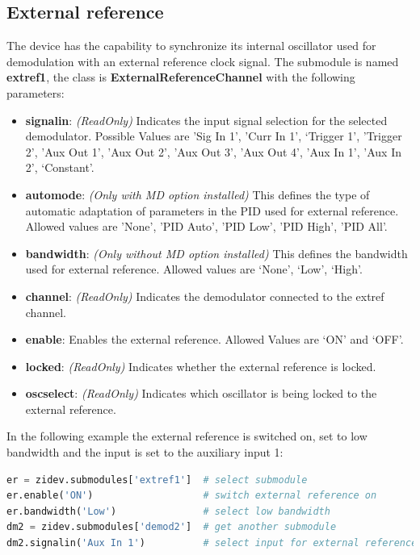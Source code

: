 \documentclass[11pt]{article} %
\begin{document}
\subsection{External reference}
The device has the capability to synchronize its internal oscillator used for demodulation with an external reference clock signal. The submodule is named {\bf extref1}, the class is {\bf ExternalReferenceChannel} with the following parameters:
\begin{itemize}
\item {\bf signalin}: {\it (ReadOnly)} Indicates the input signal selection for the selected demodulator. Possible Values are 'Sig In 1', 'Curr In 1', `Trigger 1', 'Trigger 2', 'Aux Out 1', 'Aux Out 2', 'Aux Out 3', 'Aux Out 4', 'Aux In 1', 'Aux In 2', `Constant'.
\item {\bf automode}: {\it (Only with MD option installed)} This defines the type of automatic adaptation of parameters in the PID used for external reference. Allowed values are 'None', 'PID Auto', 'PID Low', 'PID High', 'PID All'.
\item {\bf bandwidth}: {\it (Only without MD option installed)} This defines the bandwidth used for external reference. Allowed values are `None', `Low', `High'.
\item {\bf channel}: {\it (ReadOnly)} Indicates the demodulator connected to the extref channel.
\item {\bf enable}: Enables the external reference. Allowed Values are `ON' and `OFF'.
\item {\bf locked}: {\it (ReadOnly)} Indicates whether the external reference is locked.
\item {\bf oscselect}: {\it (ReadOnly)} Indicates which oscillator is being locked to the external reference.
\end{itemize}
In the following example the external reference is switched on, set to low bandwidth and the input is set to the auxiliary input 1:
\begin{lstlisting}[frame=single, language=Python]
er = zidev.submodules['extref1']  # select submodule
er.enable('ON')                   # switch external reference on
er.bandwidth('Low')               # select low bandwidth
dm2 = zidev.submodules['demod2']  # get another submodule
dm2.signalin('Aux In 1')          # select input for external reference
\end{lstlisting}
\end{document}
